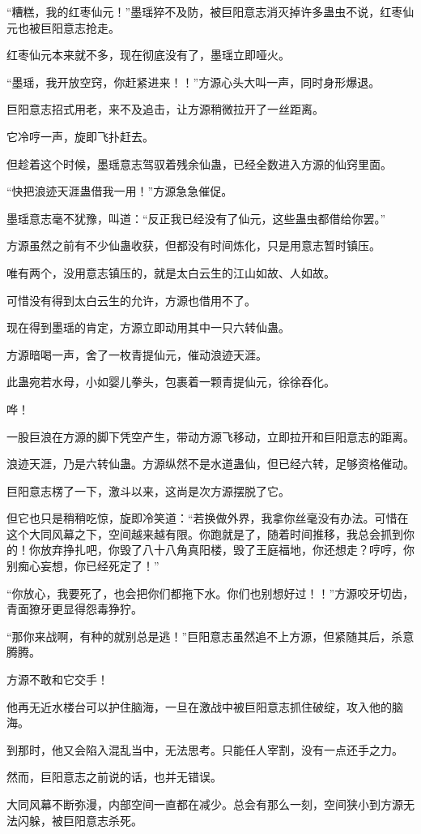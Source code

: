 \begin{this_body}
“糟糕，我的红枣仙元！”墨瑶猝不及防，被巨阳意志消灭掉许多蛊虫不说，红枣仙元也被巨阳意志抢走。

红枣仙元本来就不多，现在彻底没有了，墨瑶立即哑火。

“墨瑶，我开放空窍，你赶紧进来！！”方源心头大叫一声，同时身形爆退。

巨阳意志招式用老，来不及追击，让方源稍微拉开了一丝距离。

它冷哼一声，旋即飞扑赶去。

但趁着这个时候，墨瑶意志驾驭着残余仙蛊，已经全数进入方源的仙窍里面。

“快把浪迹天涯蛊借我一用！”方源急急催促。

墨瑶意志毫不犹豫，叫道：“反正我已经没有了仙元，这些蛊虫都借给你罢。”

方源虽然之前有不少仙蛊收获，但都没有时间炼化，只是用意志暂时镇压。

唯有两个，没用意志镇压的，就是太白云生的江山如故、人如故。

可惜没有得到太白云生的允许，方源也借用不了。

现在得到墨瑶的肯定，方源立即动用其中一只六转仙蛊。

方源暗喝一声，舍了一枚青提仙元，催动浪迹天涯。

此蛊宛若水母，小如婴儿拳头，包裹着一颗青提仙元，徐徐吞化。

哗！

一股巨浪在方源的脚下凭空产生，带动方源飞移动，立即拉开和巨阳意志的距离。

浪迹天涯，乃是六转仙蛊。方源纵然不是水道蛊仙，但已经六转，足够资格催动。

巨阳意志楞了一下，激斗以来，这尚是次方源摆脱了它。

但它也只是稍稍吃惊，旋即冷笑道：“若换做外界，我拿你丝毫没有办法。可惜在这个大同风幕之下，空间越来越有限。你跑就是了，随着时间推移，我总会抓到你的！你放弃挣扎吧，你毁了八十八角真阳楼，毁了王庭福地，你还想走？哼哼，你别痴心妄想，你已经死定了！”

“你放心，我要死了，也会把你们都拖下水。你们也别想好过！！”方源咬牙切齿，青面獠牙更显得怨毒狰狞。

“那你来战啊，有种的就别总是逃！”巨阳意志虽然追不上方源，但紧随其后，杀意腾腾。

方源不敢和它交手！

他再无近水楼台可以护住脑海，一旦在激战中被巨阳意志抓住破绽，攻入他的脑海。

到那时，他又会陷入混乱当中，无法思考。只能任人宰割，没有一点还手之力。

然而，巨阳意志之前说的话，也并无错误。

大同风幕不断弥漫，内部空间一直都在减少。总会有那么一刻，空间狭小到方源无法闪躲，被巨阳意志杀死。

\end{this_body}

